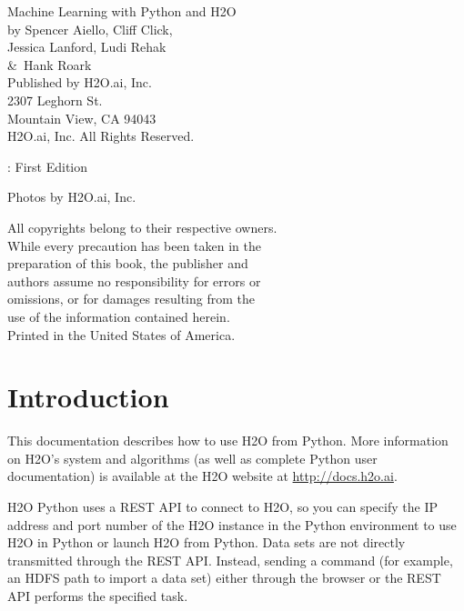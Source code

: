 {\raggedright 

Machine Learning with Python and H2O\\
  by Spencer Aiello, Cliff Click, \\ 
Jessica Lanford, Ludi Rehak \\
\&\  Hank Roark\\
\bigskip
  Published by H2O.ai, Inc. \\
2307 Leghorn St. \\
Mountain View, CA 94043\\
\bigskip
\textcopyright \the\year \hspace{1pt} H2O.ai, Inc. All Rights Reserved. 
\bigskip

\monthname \hspace{1pt}  \the\year: First Edition 
\bigskip

Photos by \textcopyright H2O.ai, Inc.
\bigskip

All copyrights belong to their respective owners.\\
While every precaution has been taken in the\\
preparation of this book, the publisher and\\
authors assume no responsibility for errors or\\
omissions, or for damages resulting from the\\
use of the information contained herein.\\
\bigskip
Printed in the United States of America. 
}


\newpage
\thispagestyle{empty}%

\tableofcontents
\thispagestyle{empty}%

\newpage

\section{Introduction}

This documentation describes how to use H2O from Python. More information on H2O's system and algorithms
(as well as complete Python user documentation) is available at the H2O website at {\url{http://docs.h2o.ai}}.

H2O Python uses a REST API to connect to H2O, so you can specify the IP address and port number of the H2O instance
in the Python environment to use H2O in Python or launch H2O from Python. Data sets are not directly transmitted
through the REST API. Instead, sending a command (for example, an HDFS path to import a data set) either through
the browser or the REST API performs the specified task.

